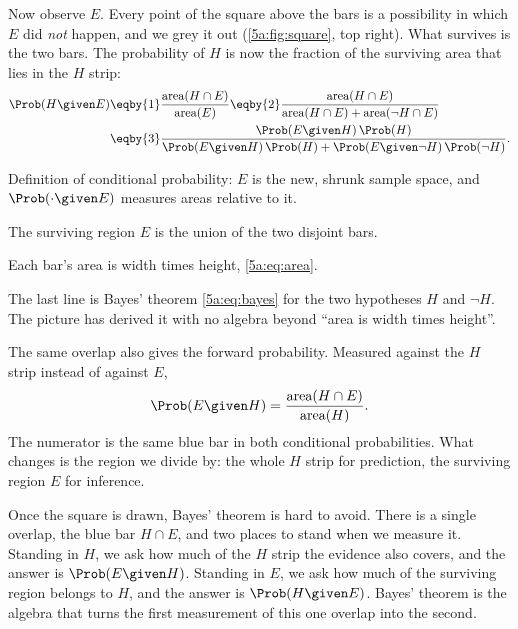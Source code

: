 Now observe $E$. Every point of the square above the bars is a possibility in
which $E$ did \emph{not} happen, and we grey it out (\cref{5a:fig:square}, top
right). What survives is the two bars. The probability of $H$ is now the fraction
of the surviving area that lies in the $H$ strip:
\begin{align}
  \Prob(H\given E)
  &\eqby{1}\frac{\text{area}(H\cap E)}{\text{area}(E)}
  \eqby{2}\frac{\text{area}(H\cap E)}{\text{area}(H\cap E)+\text{area}(\neg H\cap E)}\nonumber\\
  &\eqby{3}\frac{\Prob(E\given H)\,\Prob(H)}
               {\Prob(E\given H)\,\Prob(H)+\Prob(E\given\neg H)\,\Prob(\neg H)} .
  \label{5a:eq:bayes-area}
\end{align}
\begin{explain}
  \item Definition of conditional probability: $E$ is the new, shrunk sample
        space, and $\Prob(\cdot\given E)$ measures areas relative to it.
  \item The surviving region $E$ is the union of the two disjoint bars.
  \item Each bar's area is width times height, \eqref{5a:eq:area}.
\end{explain}
The last line is Bayes' theorem \eqref{5a:eq:bayes} for the two hypotheses $H$
and $\neg H$. The picture has derived it with no algebra beyond ``area is width
times height''.

The same overlap also gives the forward probability. Measured against the $H$
strip instead of against $E$,
\begin{equation*}
  \Prob(E\given H)=\frac{\text{area}(H\cap E)}{\text{area}(H)} .
\end{equation*}
The numerator is the same blue bar in both conditional probabilities. What
changes is the region we divide by: the whole $H$ strip for prediction, the
surviving region $E$ for inference.

Once the square is drawn, Bayes' theorem is hard to avoid. There is a single
overlap, the blue bar $H\cap E$, and two places to stand when we measure it.
Standing in $H$, we ask how much of the $H$ strip the evidence also covers, and
the answer is $\Prob(E\given H)$. Standing in $E$, we ask how much of the
surviving region belongs to $H$, and the answer is $\Prob(H\given E)$. Bayes'
theorem is the algebra that turns the first measurement of this one overlap into
the second.


